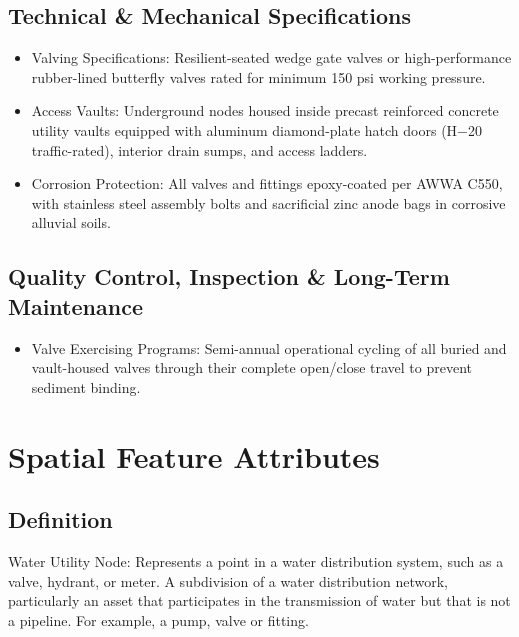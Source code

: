 \documentclass[
  letterpaper,
  DIV=11,
  numbers=noendperiod]{scrreprt}
\providecommand{\tightlist}{%
  \setlength{\itemsep}{0pt}\setlength{\parskip}{0pt}}
\begin{document}
\subsection{Technical \& Mechanical
Specifications}\label{technical-mechanical-specifications}

\begin{itemize}
\item
  Valving Specifications: Resilient-seated wedge gate valves or
  high-performance rubber-lined butterfly valves rated for minimum 150
  psi working pressure.
\item
  Access Vaults: Underground nodes housed inside precast reinforced
  concrete utility vaults equipped with aluminum diamond-plate hatch
  doors (H−20 traffic-rated), interior drain sumps, and access ladders.
\item
  Corrosion Protection: All valves and fittings epoxy-coated per AWWA
  C550, with stainless steel assembly bolts and sacrificial zinc anode
  bags in corrosive alluvial soils.
\end{itemize}

\subsection{Quality Control, Inspection \& Long-Term
Maintenance}\label{quality-control-inspection-long-term-maintenance-24}

\begin{itemize}
\tightlist
\item
  Valve Exercising Programs: Semi-annual operational cycling of all
  buried and vault-housed valves through their complete open/close
  travel to prevent sediment binding.
\end{itemize}

\section{Spatial Feature Attributes}\label{spatial-feature-attributes-8}

\subsection{Definition}\label{definition-24}

Water Utility Node: Represents a point in a water distribution system,
such as a valve, hydrant, or meter. A subdivision of a water
distribution network, particularly an asset that participates in the
transmission of water but that is not a pipeline. For example, a pump,
valve or fitting.
\end{document}
